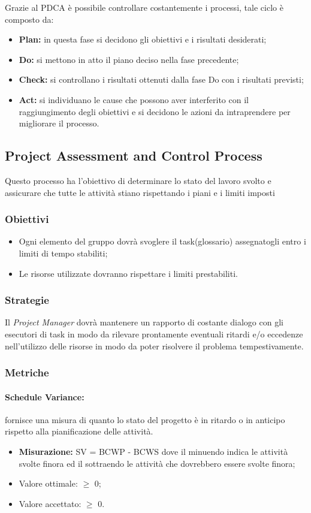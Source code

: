 	Grazie al PDCA è possibile controllare costantemente i processi, tale ciclo è composto da:
	\begin{itemize}
		\item \textbf{Plan:} in questa fase si decidono gli obiettivi e i risultati desiderati;
		\item \textbf{Do:} si mettono in atto il piano deciso nella fase precedente;	
		\item \textbf{Check:} si controllano i risultati ottenuti dalla fase Do con i risultati previsti;
		\item \textbf{Act:} si individuano le cause che possono aver interferito con il raggiungimento degli obiettivi e si decidono le azioni da intraprendere per migliorare il processo.
	\end{itemize}

	\subsection{Project Assessment and Control Process}
		Questo processo ha l'obiettivo di determinare lo stato del lavoro svolto e assicurare che tutte le attività stiano rispettando i piani e i limiti  imposti	\subsubsection{Obiettivi}
			\begin{itemize}
				\item Ogni elemento del gruppo dovrà svoglere il task(glossario) assegnatogli entro i limiti di tempo stabiliti;
				\item Le risorse utilizzate dovranno rispettare i limiti prestabiliti.
			\end{itemize}
	\subsubsection{Strategie}
	Il \textit{Project Manager} dovrà mantenere un rapporto di costante dialogo con gli esecutori di task in modo da rilevare prontamente eventuali ritardi e/o eccedenze nell'utilizzo delle risorse in modo da poter risolvere il problema tempestivamente.
	\subsubsection{Metriche}
		\paragraph{Schedule Variance:}
		fornisce una misura di quanto lo stato del progetto è in ritardo o in anticipo rispetto alla pianificazione delle attività.
		\begin{itemize}
			\item  \textbf{Misurazione: } SV =  BCWP - BCWS dove il minuendo indica le attività svolte finora ed il sottraendo le attività che dovrebbero essere svolte finora;
			\item Valore ottimale: $\geq$ 0;
			\item Valore accettato: $\geq$ 0.
		\end{itemize}
